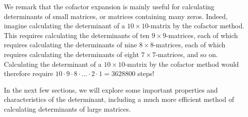 We remark that the cofactor expansion is mainly useful for calculating
determinants of small matrices, or matrices containing many
zeros. Indeed, imagine calculating the determinant of a
$10\times 10$-matrix by the cofactor method. This requires calculating
the determinants of ten $9\times 9$-matrices, each of which requires
calculating the determinants of nine $8\times 8$-matrices, each of
which requires calculating the determinants of eight
$7\times 7$-matrices, and so on. Calculating the determinant of a
$10\times 10$-matrix by the cofactor method would therefore require
$10\cdot 9\cdot 8\cdot \ldots \cdot 2\cdot 1 = 3628800$ steps!

In the next few sections, we will explore some important properties
and characteristics of the determinant, including a much more
efficient method of calculating determinants of large matrices.
